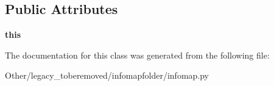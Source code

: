 \subsection*{Public Attributes}
\begin{DoxyCompactItemize}
\item 
\mbox{\label{classinfomapfolder_1_1infomap_1_1MultiplexNetwork_a6fbb6fc619a339e61dc88f4b25573d5a}} 
{\bfseries this}
\end{DoxyCompactItemize}


The documentation for this class was generated from the following file\+:\begin{DoxyCompactItemize}
\item 
Other/legacy\+\_\+toberemoved/infomapfolder/infomap.\+py\end{DoxyCompactItemize}
